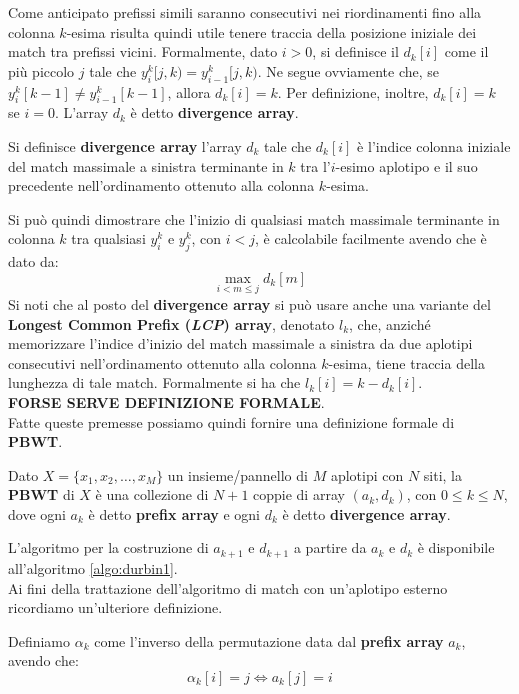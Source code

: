 Come anticipato prefissi simili saranno consecutivi nei riordinamenti fino alla
colonna $k$-esima risulta quindi utile tenere traccia della posizione iniziale
dei match tra prefissi vicini. Formalmente, dato $i>0$, si definisce il
$d_k[i]$ come il più piccolo $j$ tale che $y_i^k[j,k)=y_{i-1}^k[j,k)$. Ne segue
ovviamente che, se $y_i^k[k-1]\neq y_{i-1}^k[k-1]$, allora $d_k[i]=k$. Per
definizione, inoltre, $d_k[i]=k$ se $i=0$. L'array $d_k$ è detto
\textbf{divergence array}.
\begin{definizione}
  Si definisce \textbf{divergence array} l'array $d_k$ tale che $d_k[i]$ è
  l'indice colonna iniziale del match massimale a sinistra terminante in $k$ tra
  l'$i$-esimo aplotipo e il suo precedente nell'ordinamento ottenuto alla
  colonna $k$-esima.
\end{definizione}
Si può quindi dimostrare che l'inizio di qualsiasi match massimale terminante in
colonna $k$ tra qualsiasi $y_i^k$ e $y_j^k$, con $i<j$, è calcolabile facilmente
avendo che è dato da:
\[\max_{i<m\leq j}d_k[m]\]
Si noti che al posto del \textbf{divergence array} si può usare anche una
variante del \textbf{Longest Common Prefix (\textit{LCP}) array}, denotato
$l_k$, che, anziché 
memorizzare l'indice d'inizio del match massimale a sinistra da due aplotipi
consecutivi nell'ordinamento ottenuto alla colonna $k$-esima, tiene traccia
della lunghezza di tale match. Formalmente si ha che $l_k[i]=k-d_k[i]$. \\ 
\textbf{FORSE SERVE DEFINIZIONE FORMALE}.\\
Fatte queste premesse possiamo quindi fornire una definizione formale di
\textbf{PBWT}.
\begin{definizione}
  Dato $X=\{x_1,x_2,\ldots,x_M\}$ un insieme/pannello di $M$ aplotipi con $N$
  siti, la \textbf{PBWT} di $X$ è una collezione di $N+1$ coppie di array
  $(a_k,d_k)$, con $0\leq k\leq N$, dove ogni $a_k$ è detto \textbf{prefix
    array} e ogni $d_k$ è detto \textbf{divergence array}. 
\end{definizione}
L'algoritmo per la costruzione di $a_{k+1}$ e $d_{k+1}$ a partire da $a_k$ e
$d_k$ è disponibile all'algoritmo \ref{algo:durbin1}.\\
Ai fini della trattazione dell'algoritmo di match con un'aplotipo esterno
ricordiamo un'ulteriore definizione.
\begin{definizione}
  Definiamo $\alpha_k$ come l'inverso della permutazione data dal \textbf{prefix
    array} $a_k$, avendo che:
  \[\alpha_k[i]=j \iff a_k[j]=i\]
\end{definizione}
